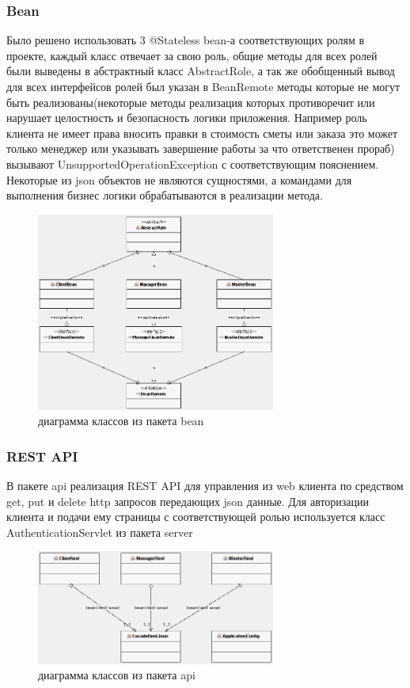 \subsubsection{Bean}
Было решено использовать 3 @Stateless bean-а соответствующих ролям в проекте, каждый класс отвечает за свою роль, общие методы для всех ролей были выведены в абстрактный класс AbstractRole, а так же обобщенный вывод для всех интерфейсов ролей был указан в BeanRemote методы которые не могут быть реализованы(некоторые методы реализация которых противоречит или нарушает целостность и безопасность логики приложения. Например роль клиента не имеет права вносить правки в стоимость сметы или заказа это может только менеджер или указывать завершение работы за что ответственен прораб) вызывают UnsupportedOperationException с соответствующим пояснением. Некоторые из json объектов не являются сущностями, а командами для выполнения бизнес логики обрабатываются в реализации метода.
\begin{figure}[!ht]
	\centering
	\includegraphics[width=0.7\textwidth]{img/bean.png}
	\caption{диаграмма классов из пакета bean}
\end{figure}
\newpage
\subsubsection{REST API}
В пакете api реализация REST API для управления из web клиента по средством get, put и delete http запросов передающих json данные. Для авторизации клиента и подачи ему страницы с соответствующей ролью используется класс AuthenticationServlet из пакета server
\begin{figure}[!ht]
	\centering
	\includegraphics[width=0.7\textwidth]{img/api.png}
	\caption{диаграмма классов из пакета api}
\end{figure}


